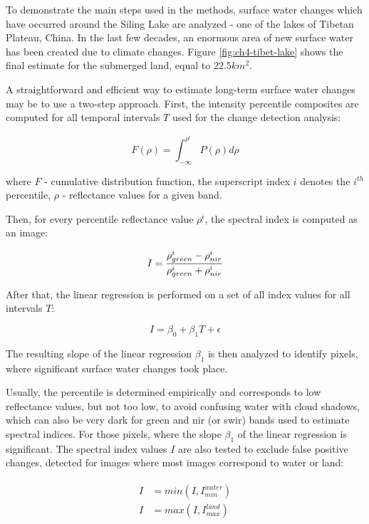 To demonstrate the main steps used in the methods, surface water changes which have occurred around the Siling Lake are analyzed - one of the lakes of Tibetan Plateau, China. In the last few decades, an enormous area of new surface water has been created due to climate changes. Figure \ref{fig:ch4-tibet-lake} shows the final estimate for the submerged land, equal to $22.5 km^2$. 

A straightforward and efficient way to estimate long-term surface water changes may be to use a two-step approach. First, the intensity percentile composites are computed for all temporal intervals $T$ used for the change detection analysis:

\begin{equation}
F(\rho) = \int_{-\infty}^{\rho^i} P(\rho)d\rho
\end{equation}

where $F$ - cumulative distribution function, the superscript index $i$ denotes the $i^{th}$ percentile, $\rho$ - reflectance values for a given band.

Then, for every percentile reflectance value $\rho^i$, the spectral index is computed as an image:

\begin{equation}
I = \frac{\rho_{green}^i-\rho_{nir}^i}{\rho_{green}^i+\rho_{nir}^i} \\
\end{equation}

After that, the linear regression is performed on a set of all index values for all intervals $T$:

\begin{equation}
I = \beta_0 + \beta_1 T + \epsilon
\end{equation}

The resulting slope of the linear regression $\beta_1$ is then analyzed to identify pixels, where significant surface water changes took place. 

Usually, the percentile is determined empirically and corresponds to low reflectance values, but not too low, to avoid confusing water with cloud shadows, which can also be very dark for green and nir (or swir) bands used to estimate spectral indices. For those pixels, where the slope $\beta_1$ of the linear regression is significant. The spectral index values $I$ are also tested to exclude false positive changes, detected for images where most images correspond to water or land:

\begin{equation}
\begin{split}
\begin{aligned}
I &= min\left(I, I_{min}^{water}\right) \\
I &= max\left(I, I_{max}^{land}\right) 
\end{aligned}
\end{split}
\label{eq:water-land-suppression}
\end{equation}

